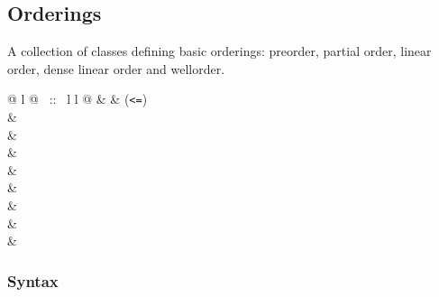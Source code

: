 \begin{isabellebody}
\begin{isamarkuptext}
\section{Orderings}

A collection of classes defining basic orderings:
preorder, partial order, linear order, dense linear order and wellorder.
\smallskip

\begin{supertabular}{@ {} l @ {~::~} l l @ {}}
 &  & (\verb$<=$)\\
 & \\
 & \\
 & \\
 & \\
 & \\
 & \\
 & \\
 & \\
\end{supertabular}

\subsubsection*{Syntax}


\end{isamarkuptext}
\end{isabellebody}
